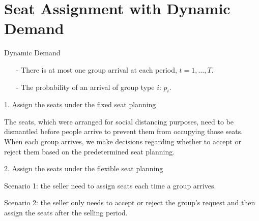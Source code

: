 
\section{Seat Assignment with Dynamic Demand}
    \frame{\sectionpage}

\begin{frame}{Dynamic Demand}
  \begin{itemize}
    \item[-] There is at most one group arrival at each period, $t = 1, \ldots, T$. 
    \item[-] The probability of an arrival of group type $i$: $p_i$.  
  \end{itemize}

  1. Assign the seats under the fixed seat planning

  \begin{footnotesize}
    The seats, which were arranged for social distancing purposes, need to be dismantled before people arrive to prevent them from occupying those seats. When each group arrives, we make decisions regarding whether to accept or reject them based on the predetermined seat planning.
  \end{footnotesize}

  \vspace{0.3cm}

  2. Assign the seats under the flexible seat planning

  \begin{footnotesize}
  Scenario 1: the seller need to assign seats each time a group arrives. 
  
  Scenario 2: the seller only needs to accept or reject the group's request and then assign the seats after the selling period.
  \end{footnotesize}
\end{frame}

